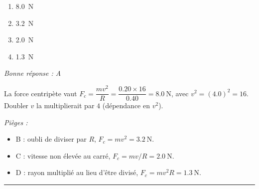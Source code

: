 \documentclass[11pt,a4paper]{article}
\newcommand{\vv}[1]{\vec{#1}}\newcommand{\ds}{\displaystyle}
\begin{document}
\begin{center}
\end{center}
\begin{enumerate}[label=\Alph*)]
\item \qty{8.0}{\newton}
\item \qty{3.2}{\newton}
\item \qty{2.0}{\newton}
\item \qty{1.3}{\newton}
\end{enumerate}
\textit{Bonne réponse : A}\par
La force centripète vaut $F_c=\dfrac{mv^2}{R}=\dfrac{\num{0.20}\times16}{\num{0.40}}=\qty{8.0}{\newton}$, avec $v^2=(\num{4.0})^2=16$. Doubler $v$ la multiplierait par $4$ (dépendance en $v^2$).\par
\textit{Pièges :}
\begin{itemize}
\item B : oubli de diviser par $R$, $F_c=mv^2=\qty{3.2}{\newton}$.
\item C : vitesse non élevée au carré, $F_c=mv/R=\qty{2.0}{\newton}$.
\item D : rayon multiplié au lieu d'être divisé, $F_c=mv^2R=\qty{1.3}{\newton}$.
\end{itemize}
\vspace{8pt}\hrule\vspace{8pt}
\end{document}

